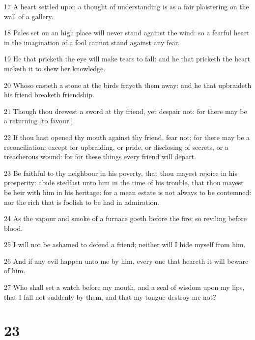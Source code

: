 \par 17 A heart settled upon a thought of understanding is as a fair plaistering on the wall of a gallery.
\par 18 Pales set on an high place will never stand against the wind: so a fearful heart in the imagination of a fool cannot stand against any fear.
\par 19 He that pricketh the eye will make tears to fall: and he that pricketh the heart maketh it to shew her knowledge.
\par 20 Whoso casteth a stone at the birds frayeth them away: and he that upbraideth his friend breaketh friendship.
\par 21 Though thou drewest a sword at thy friend, yet despair not: for there may be a returning [to favour.]
\par 22 If thou hast opened thy mouth against thy friend, fear not; for there may be a reconciliation: except for upbraiding, or pride, or disclosing of secrets, or a treacherous wound: for for these things every friend will depart.
\par 23 Be faithful to thy neighbour in his poverty, that thou mayest rejoice in his prosperity: abide stedfast unto him in the time of his trouble, that thou mayest be heir with him in his heritage: for a mean estate is not always to be contemned: nor the rich that is foolish to be had in admiration.
\par 24 As the vapour and smoke of a furnace goeth before the fire; so reviling before blood.
\par 25 I will not be ashamed to defend a friend; neither will I hide myself from him.
\par 26 And if any evil happen unto me by him, every one that heareth it will beware of him.
\par 27 Who shall set a watch before my mouth, and a seal of wisdom upon my lips, that I fall not suddenly by them, and that my tongue destroy me not?

\chapter{23}


